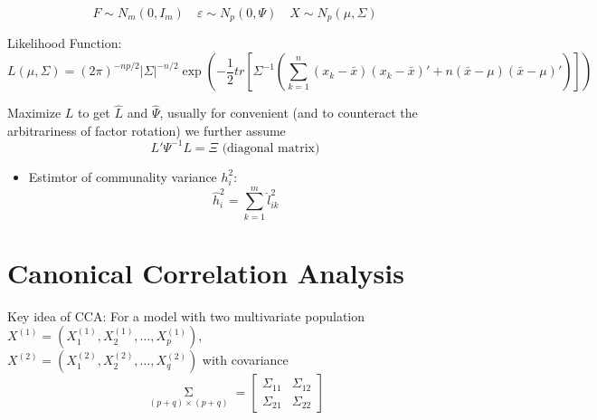     \begin{equation}
        F\sim N_m(0,I_m)\quad \varepsilon \sim N_p(0,\Psi )\quad X\sim N_p(\mu,\Sigma ) 
    \end{equation}

    Likelihood Function:
    \begin{equation}
        L(\mu ,\Sigma ) =(2\pi)^{-np/2}|\Sigma |^{-n/2}\exp\left( -\dfrac{1}{2}tr\left[ \Sigma ^{-1}\left( \sum_{k=1}^n(x_k-\bar{x})(x_k-\bar{x})'+n(\bar{x}-\mu)(\bar{x}-\mu)' \right) \right] \right)
    \end{equation}

    Maximize $ L $ to get $ \hat{L}  $ and $ \hat{\Psi } $, usually for convenient (and to counteract the arbitrariness of factor rotation) we further assume
    \begin{equation}
        L'\Psi ^{-1}L=\varXi \text{ (diagonal matrix)} 
    \end{equation}
    
    \begin{itemize}[topsep=2pt,itemsep=2pt]
        \item Estimtor of communality variance $ h_i^2 $:
        \begin{equation}
            \hat{h}_i^2=\sum_{k=1}^m \hat{l}_{ik}^2 
        \end{equation}
        
        
    \end{itemize}
    
        
    
    
    
    











\section{Canonical Correlation Analysis}
    Key idea of CCA: For a model with two multivariate population $ X^{(1)}=(X^{(1)}_{1},X^{(1)}_{2},\ldots,X^{(1)}_{p})  $, \\$ X^{(2)}=(X^{(2)}_{1},X^{(2)}_{2},\ldots,X^{(2)}_{q})  $ with covariance
    \begin{equation}
        \mathop{\Sigma }\limits_{(p+q)\times (p+q)}  =\begin{bmatrix}
            \Sigma _{11}&\Sigma _{12}\\
            \Sigma _{21}&\Sigma _{22}
        \end{bmatrix} 
    \end{equation}
    
